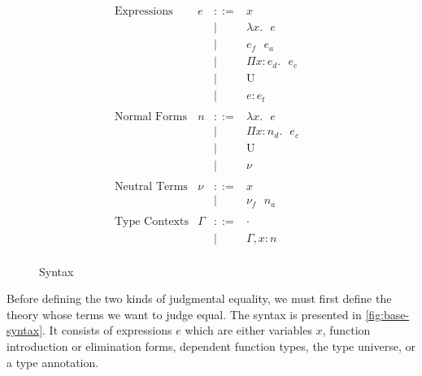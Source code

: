\documentclass{article}
\newcommand{\bnfdef}{::=}
\newcommand{\bnfalt}{\mid}
\newcommand{\bnfcomment}[1]{}%
\newcommand{\lamE}[2]{\lambda #1. \text{ } #2}
\newcommand{\appE}[2]{#1 \text{ } #2}
\newcommand{\piE}[3]{\Pi #1 : #2. \text{ } #3}
\newcommand{\univE}{\text{U}}
\newcommand{\annE}[2]{#1 : #2}
\begin{document}
\begin{figure}[!htb]
  \begin{displaymath}
    \begin{array}{lrcll}
      \text{Expressions} & e & \bnfdef & x & \bnfcomment{variables} \\
      & & \bnfalt & \lamE{x}{e} & \bnfcomment{function literal} \\
      & & \bnfalt & \appE{e_f}{e_a} & \bnfcomment{function application} \\
      & & \bnfalt & \piE{x}{e_d}{e_c} & \bnfcomment{dependent function type} \\
      & & \bnfalt & \univE & \bnfcomment{type universe} \\
      & & \bnfalt & \annE{e}{e_t} & \bnfcomment{type annotation} \\
      \\
      \text{Normal Forms} & n & \bnfdef & \lamE{x}{e} & \\
      & & \bnfalt & \piE{x}{n_d}{e_c} & \\
      & & \bnfalt & \univE & \\
      & & \bnfalt & \nu & \\
      \\
      \text{Neutral Terms} & \nu & \bnfdef & x & \\
      & & \bnfalt & \appE{\nu_f}{n_a} & \\
      \\
      \text{Type Contexts} & \Gamma & \bnfdef & \cdot & \\
      & & \bnfalt & \Gamma, x : n & \\
    \end{array}
  \end{displaymath}
  \caption{Syntax}
  \label{fig:base-syntax}
\end{figure}

Before defining the two kinds of judgmental equality, we must first define the theory whose terms we want to judge equal.
The syntax is presented in \autoref{fig:base-syntax}.
It consists of expressions $e$ which are either variables $x$, function introduction or elimination forms, dependent function types, the type universe, or a type annotation.
\end{document}
